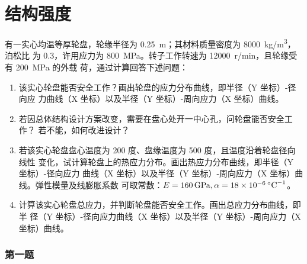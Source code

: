 
\part{结构强度}

\begin{tcolorbox}
    有一实心均温等厚轮盘，轮缘半径为 \qty{0.25}{\meter}；其材料质量密度为 \qty{8000}{kg/m^3}，泊松比
为 0.3，许用应力为 \qty{800}{MPa}。转子工作转速为 \qty{12000}{r/min}，且轮缘受有 \qty{200}{MPa} 的外载
荷，通过计算回答下述问题：
    \begin{enumerate}
        \item 该实心轮盘能否安全工作？画出轮盘的应力分布曲线，即半径（Y 坐标）-径向应
        力曲线（X 坐标）以及半径（Y 坐标）-周向应力（X 坐标）曲线。
        \item 若因总体结构设计方案改变，需要在盘心处开一中心孔，问轮盘能否安全工作？
        若不能，如何改进设计？
        \item 若该实心轮盘盘心温度为 200 度、盘缘温度为 500 度，且温度沿着轮盘径向线性
        变化，试计算轮盘上的热应力分布。画出热应力分布曲线，即半径（Y 坐标）-径向应力
        曲线（X 坐标）以及半径（Y 坐标）-周向应力（X 坐标）曲线。弹性模量及线膨胀系数
        可取常数：$E=\qty{160}{GPa}, \alpha=\qty{18e{-6}}{\degreeCelsius^{-1}}$。
        \item 计算该实心轮盘总应力，并判断轮盘能否安全工作。画出总应力分布曲线，即半
        径（Y 坐标）-径向应力曲线（X 坐标）以及半径（Y 坐标）-周向应力（X 坐标）曲线。
    \end{enumerate}
\end{tcolorbox}

\section{第一题}

